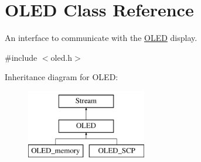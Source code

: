 \hypertarget{class_o_l_e_d}{}\section{O\+L\+ED Class Reference}
\label{class_o_l_e_d}


An interface to communicate with the \hyperlink{class_o_l_e_d}{O\+L\+ED} display.  




{\ttfamily \#include $<$oled.\+h$>$}

Inheritance diagram for O\+L\+ED\+:\begin{figure}[H]
\begin{center}
\leavevmode
\includegraphics[height=3.000000cm]{class_o_l_e_d}
\end{center}
\end{figure}
